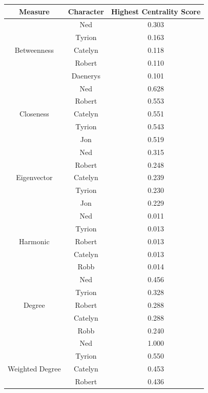 \documentclass[10pt,twocolumn,letterpaper]{article}
\begin{document}
\begin{table}[!h]
    \centering
    \small
    \begin{tabular}{c|c|c}
        Measure & Character & \small{Highest Centrality Score} \\
        \hline
                    & Ned & 0.303 \\
                    & Tyrion & 0.163 \\
        Betweenness & Catelyn & 0.118 \\
                    & Robert & 0.110 \\
                    & Daenerys & 0.101 \\
        \hline 
                    & Ned & 0.628 \\
                    & Robert & 0.553 \\
        Closeness   & Catelyn & 0.551 \\
                    & Tyrion & 0.543 \\
                    & Jon & 0.519 \\
        \hline 
                    & Ned & 0.315 \\
                    & Robert & 0.248 \\
        Eigenvector & Catelyn & 0.239 \\
                    & Tyrion & 0.230 \\
                    & Jon & 0.229 \\
        \hline 
                    & Ned & 0.011 \\
                    & Tyrion & 0.013 \\
        Harmonic    & Robert & 0.013 \\
                    & Catelyn & 0.013 \\
                    & Robb & 0.014 \\
        \hline
                    & Ned & 0.456 \\
                    & Tyrion & 0.328 \\
        Degree      & Robert & 0.288 \\
                    & Catelyn & 0.288 \\
                    & Robb & 0.240 \\
        \hline
                    & Ned & 1.000 \\
                    & Tyrion & 0.550 \\
        Weighted Degree & Catelyn & 0.453 \\
                    & Robert & 0.436 \\

\end{tabular}
\end{table}
\end{document}
